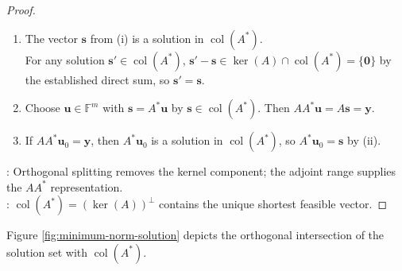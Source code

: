 \begin{theorem}
\begin{proof}
\begin{enumerate}[label=(\roman*)]
Write $\mathbf{x}_0=\mathbf{s}+\mathbf{v}$ with $\mathbf{s}\in\operatorname{col}(A^*)$ and $\mathbf{v}\in\ker(A)$ by the established orthogonal direct sum. Then $A\mathbf{s}=\mathbf{y}$.\\
For $\mathbf{x}\in\mathbb{F}^n$ with $A\mathbf{x}=\mathbf{y}$, set $\mathbf{w}\defeq\mathbf{x}-\mathbf{s}$. Then $A\mathbf{w}=A\mathbf{x}-A\mathbf{s}=\mathbf{0}$, so $\mathbf{w}\in\ker(A)$.\\
Since $\mathbf{s}\perp\mathbf{w}$, $\norm{\mathbf{x}}_2^2=\norm{\mathbf{s}}_2^2+\norm{\mathbf{w}}_2^2\geq\norm{\mathbf{s}}_2^2$ by Theorem \ref{thm:pythagorean-inner-product}.\\
Equality holds iff $\mathbf{w}=\mathbf{0}$, equivalently $\mathbf{x}=\mathbf{s}$; hence $\mathbf{s}$ is the unique minimum-norm solution.
\item The vector $\mathbf{s}$ from (i) is a solution in $\operatorname{col}(A^*)$.\\
For any solution $\mathbf{s}'\in\operatorname{col}(A^*)$, $\mathbf{s}'-\mathbf{s}\in\ker(A)\cap\operatorname{col}(A^*)=\{\mathbf{0}\}$ by the established direct sum, so $\mathbf{s}'=\mathbf{s}$.
\item Choose $\mathbf{u}\in\mathbb{F}^m$ with $\mathbf{s}=A^*\mathbf{u}$ by $\mathbf{s}\in\operatorname{col}(A^*)$. Then $AA^*\mathbf{u}=A\mathbf{s}=\mathbf{y}$.
\item If $AA^*\mathbf{u}_0=\mathbf{y}$, then $A^*\mathbf{u}_0$ is a solution in $\operatorname{col}(A^*)$, so $A^*\mathbf{u}_0=\mathbf{s}$ by (ii).
\end{enumerate}
: Orthogonal splitting removes the kernel component; the adjoint range supplies the $AA^*$ representation.\\
: $\operatorname{col}(A^*)=(\ker(A))^{\perp}$ contains the unique shortest feasible vector.
\end{proof}
\end{theorem}

Figure \ref{fig:minimum-norm-solution} depicts the orthogonal intersection of the solution set with $\operatorname{col}(A^*)$.
\begin{illustrationfigure}[H]
  \centering
  
  \caption{The solution set $\mathbf{s}+\ker(A)$ meets $\operatorname{col}(A^*)=(\ker(A))^\perp$ at its unique minimum-norm point $\mathbf{s}$.}
  \label{fig:minimum-norm-solution}
\end{illustrationfigure}

